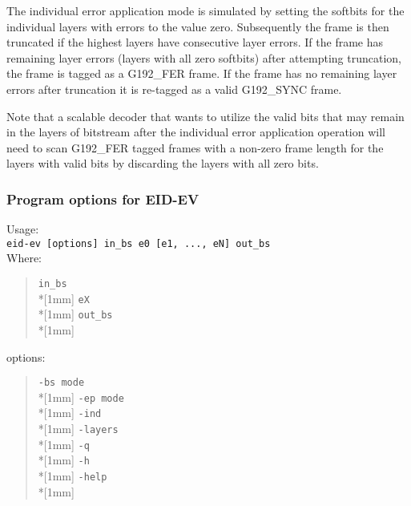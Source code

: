 The individual error application mode is simulated by setting 
the softbits for the individual layers with errors to the 
value zero. Subsequently the frame is then truncated if the 
highest layers have consecutive layer errors. If the frame has 
remaining layer errors (layers with all zero softbits) after 
attempting truncation, the frame is tagged as a G192\_FER frame.  
If the frame has no remaining layer errors after truncation it is 
re-tagged as a valid G192\_SYNC frame.

Note that a scalable decoder that wants to utilize the valid bits that
may remain in the layers of bitstream after the individual error
application operation will need to scan G192\_FER tagged frames with a
non-zero frame length for the layers with valid bits by discarding the
layers with all zero bits.

\subsubsection{Program options for EID-EV}
Usage:\\
{\tt eid-ev [options] in\_bs e0 [e1, ..., eN] out\_bs}\\
Where:
\begin{quote} \normalsize
 {\tt in\_bs} \hfill {} \\*[1mm]
 {\tt eX} \hfill {} \\*[1mm]
 {\tt out\_bs} \hfill {}\\*[1mm]
\end{quote}
options:\\
\begin{quote} \normalsize
 {\tt -bs mode} \hfill {} \\*[1mm]
 {\tt -ep mode} \hfill {} \\*[1mm]
 {\tt -ind} \hfill {} \\*[1mm]
 {\tt -layers } \hfill {} \\*[1mm]
 {\tt -q} \hfill {} \\*[1mm]
 {\tt -h} \hfill {} \\*[1mm]
 {\tt -help} \hfill {} \\*[1mm]
\end{quote}
 
